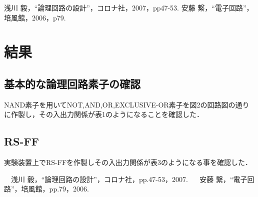 \documentclass[11pt,a4paper]{jsarticle}
\begin{document}
\begin{thebibliography}{9}
 \bibitem[1] 浅川 毅，``論理回路の設計''，コロナ社，2007，pp47-53.
 \bibitem[2] 安藤 繋，``電子回路''，培風館，2006，p79.
\end{thebibliography}

\newpage
\pagestyle{fancy}
\setcounter{page}{1}
\setcounter{section}{3}
\renewcommand{\thepage}{$再々$\,\arabic{page}}
\renewcommand{\headrulewidth}{0.0pt}
\rhead{\thepage}
\lhead{}
\cfoot{}


\section{結果}
\subsection{基本的な論理回路素子の確認}
NAND素子を用いてNOT,AND,OR,EXCLUSIVE-OR素子を図2の回路図の通りに作製し，その入出力関係が表1のようになることを確認した．

\setcounter{subsection}{2}

\subsection{RS-FF}
実験装置上でRS-FFを作製しその入出力関係が表3のようになる事を確認した．


\begin{thebibliography}{9}
 \bibitem[1] 　浅川 毅，``論理回路の設計''，コロナ社，pp.47-53，2007.
 \bibitem[2]　 安藤 繋，``電子回路''，培風館，pp.79，2006.
\end{thebibliography}
\end{document}
